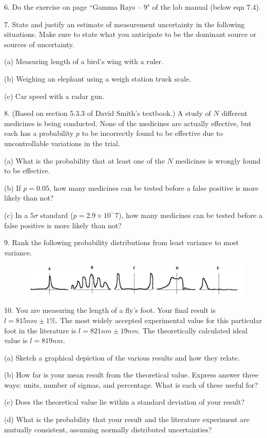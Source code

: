 \documentclass[12pt]{article}
\newcommand{\qspace}{\vskip15pt}
\newcommand{\hqspace}{\vskip5pt}
\begin{document}
\qspace

6. Do the exercise on page ``Gamma Rays -- 9" of the lab manual (below eqn 7.4).

\qspace

7. State and justify an estimate of measurement uncertainty in the following situations. Make sure to state what you anticipate to be the dominant source or sources of uncertainty.

(a) Measuring length of a bird's wing with a ruler.

(b) Weighing an elephant using a weigh station truck scale.

(c) Car speed with a radar gun.

\qspace
 
8. (Based on section 5.3.3 of David Smith's textbook.) A study of $N$ different medicines is being conducted. None of the medicines are actually effective, but each has a probability $p$ to be incorrectly found to be effective due to uncontrollable variations in the trial.

(a) What is the probability that at least one of the $N$ medicines is wrongly found to be effective.

(b) If $p=0.05$, how many medicines can be tested before a false positive is more likely than not?

(c) In a $5\sigma$ standard ($p=2.9 \times 10^-7$), how many medicines can be tested before a false positive is more likely than not?

\qspace

9. Rank the following probability distributions from least variance to most variance.

\begin{figure}[h]
\centerline{
	\includegraphics[width=.9\textwidth]{001.png}
	}
\end{figure}


\hqspace

10. You are measuring the length of a fly's foot. Your final result is $l=815nm \pm 1\% $. The most widely accepted experimental value for this particular foot in the literature is $l=821nm \pm 19nm$. The theoretically calculated ideal value is $l=819nm$.

(a) Sketch a graphical depiction of the various results and how they relate.

(b) How far is your mean result from the theoretical value. Express answer three ways: units, number of sigmas, and percentage. What is each of these useful for?

(c) Does the theoretical value lie within a standard deviation of your result?

(d) What is the probability that your result and the literature experiment are mutually consistent, assuming normally distributed uncertainties?
\end{document}
